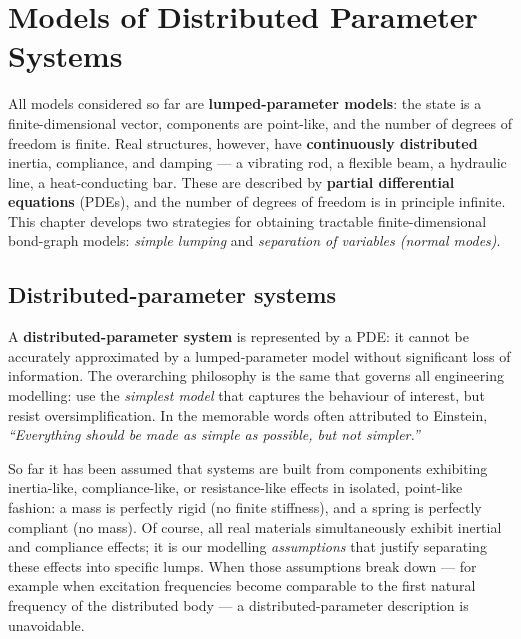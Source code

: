 \chapter{Models of Distributed Parameter Systems}
\label{ch:distributed}

All models considered so far are \textbf{lumped-parameter models}: the state is a
finite-dimensional vector, components are point-like, and the number of degrees of
freedom is finite. Real structures, however, have \textbf{continuously distributed}
inertia, compliance, and damping --- a vibrating rod, a flexible beam, a hydraulic
line, a heat-conducting bar. These are described by \textbf{partial differential
equations} (PDEs), and the number of degrees of freedom is in principle infinite.
This chapter develops two strategies for obtaining tractable finite-dimensional
bond-graph models: \emph{simple lumping} and \emph{separation of variables (normal
modes)}.

\section{Distributed-parameter systems}
\label{sec:distrib_intro}

A \textbf{distributed-parameter system} is represented by a PDE: it cannot be
accurately approximated by a lumped-parameter model without significant loss of
information. The overarching philosophy is the same that governs all engineering
modelling: use the \emph{simplest model} that captures the behaviour of interest,
but resist oversimplification. In the memorable words often attributed to
Einstein, \emph{``Everything should be made as simple as possible, but not simpler.''}

So far it has been assumed that systems are built from components exhibiting
inertia-like, compliance-like, or resistance-like effects in isolated, point-like
fashion: a mass is perfectly rigid (no finite stiffness), and a spring is
perfectly compliant (no mass). Of course, all real materials simultaneously
exhibit inertial and compliance effects; it is our modelling \emph{assumptions}
that justify separating these effects into specific lumps. When those assumptions
break down --- for example when excitation frequencies become comparable to the
first natural frequency of the distributed body --- a distributed-parameter
description is unavoidable.

